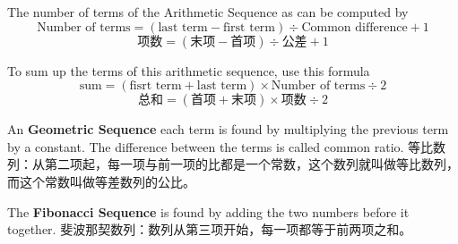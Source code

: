 \begin{newprop}[项数公式]
The number of terms of the Arithmetic Sequence as can be computed by 
$$
\text{Number of terms} = (\text{last term} - \text{first term}) \div \text{Common difference} + 1
$$
$$
\text{项数} = (\text{末项} - \text{首项}) \div \text{公差} + 1
$$
\end{newprop}

\begin{newprop}
To sum up the terms of this arithmetic sequence, use this formula
$$
\text{sum} = (\text{fisrt term} + \text{last term}) \times \text{Number of terms} \div 2
$$
$$
\text{总和} = (\text{首项} + \text{末项}) \times \text{项数} \div 2
$$
\end{newprop}

\begin{paracol}{2}
An {\bf Geometric Sequence} each term is found by multiplying the previous term by a constant. The difference between the terms is called common ratio.
\switchcolumn
等比数列：从第二项起，每一项与前一项的比都是一个常数，这个数列就叫做等比数列，而这个常数叫做等差数列的公比。
\end{paracol}

\begin{paracol}{2}
The {\bf  Fibonacci Sequence} is found by adding the two numbers before it together. 
\switchcolumn
斐波那契数列：数列从第三项开始，每一项都等于前两项之和。
\end{paracol}
\newpage
